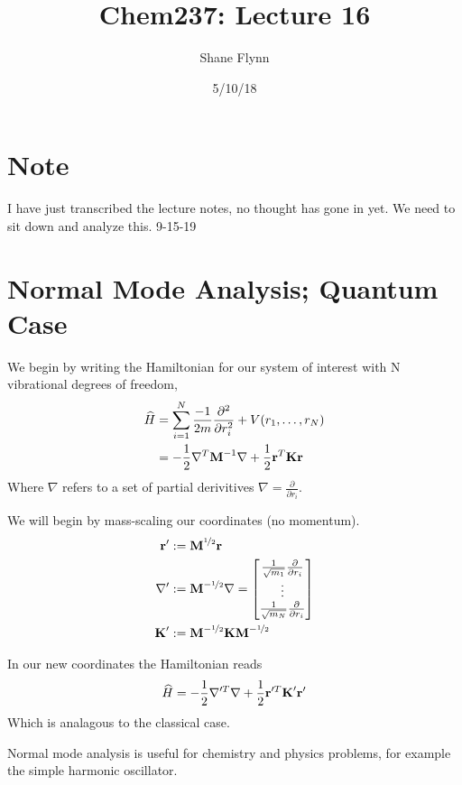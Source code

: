 \documentclass{article}
\title{Chem237: Lecture 16}
\date{5/10/18}
\author{Shane Flynn}
\newcommand{\be}{\begin{equation}}
\newcommand{\ee}{\end{equation}}
\newcommand{\pd}{\partial}
\newcommand{\half}{\frac{1}{2}}
\newcommand{\nhalf}{\nicefrac{1}{2}}
\newcommand{\pri}{\frac{\pd}{\pd r_i}}
\newcommand{\bM}{\mbox{\bf M}}
\newcommand{\bK}{\mbox{\bf K}}
\newcommand{\br}{\mbox{\bf r}}
\begin{document}
\maketitle

\section{Note}
I have just transcribed the lecture notes, no thought has gone in yet. We need to sit down and analyze this. 9-15-19

\section{Normal Mode Analysis; Quantum Case}
We begin by writing the Hamiltonian for our system of interest with N vibrational degrees of freedom,
\be
\begin{split}
    \widehat{H}&= \sum_{i = 1}^{N} \frac{-1}{2 m}  \frac{\pd^2}{\pd r_i^2}+ V(r_1,\dots,r_N)\\
    &=-\half \nabla^T\bM^{-1}\nabla + \half \br^T\bK\br
\end{split}
\ee
Where $\nabla$ refers to a set of partial derivitives $\nabla = \pri$.


We will begin by mass-scaling our coordinates (no momentum).
\be
\begin{split}
    \br' &:= \bM^{\nhalf}\br\\
    \nabla' &:= \bM^{-\nhalf}\nabla =
    \begin{bmatrix}
        \frac{1}{\sqrt{m_1}} \pri\\
        \vdots \\
        \frac{1}{\sqrt{m_N}} \pri
    \end{bmatrix}\\
    \bK' &:= \bM^{-\nhalf}\bK \bM^{-\nhalf}
\end{split}
\ee

In our new coordinates the Hamiltonian reads
\be
    \widehat{H}= -\half\nabla'^T\nabla+\half\br'^T\bK'\br'
\ee
Which is analagous to the classical case.

Normal mode analysis is useful for chemistry and physics problems, for example the simple harmonic oscillator.
\end{document}
